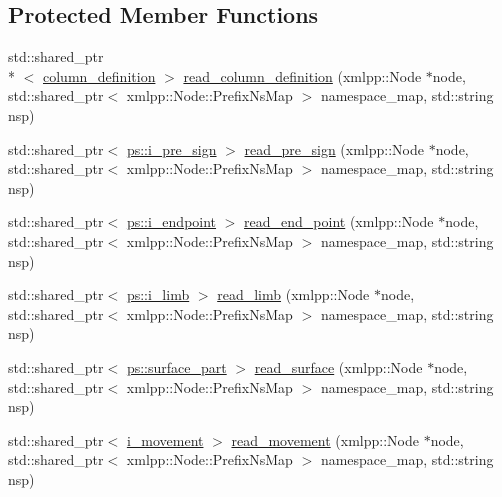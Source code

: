 \subsection*{Protected Member Functions}
\begin{DoxyCompactItemize}
\item 
std\-::shared\-\_\-ptr\\*
$<$ \hyperlink{classmae_1_1fl_1_1laban_1_1column__definition}{column\-\_\-definition} $>$ \hyperlink{classmae_1_1fl_1_1laban_1_1internal__laban__sequence__reader_a35b96563ec41f91be478d25db2e71d3a}{read\-\_\-column\-\_\-definition} (xmlpp\-::\-Node $\ast$node, std\-::shared\-\_\-ptr$<$ xmlpp\-::\-Node\-::\-Prefix\-Ns\-Map $>$ namespace\-\_\-map, std\-::string nsp)
\item 
std\-::shared\-\_\-ptr$<$ \hyperlink{classmae_1_1fl_1_1laban_1_1ps_1_1i__pre__sign}{ps\-::i\-\_\-pre\-\_\-sign} $>$ \hyperlink{classmae_1_1fl_1_1laban_1_1internal__laban__sequence__reader_a2a5210cafc9e3885600d7925fe2f4f72}{read\-\_\-pre\-\_\-sign} (xmlpp\-::\-Node $\ast$node, std\-::shared\-\_\-ptr$<$ xmlpp\-::\-Node\-::\-Prefix\-Ns\-Map $>$ namespace\-\_\-map, std\-::string nsp)
\item 
std\-::shared\-\_\-ptr$<$ \hyperlink{classmae_1_1fl_1_1laban_1_1ps_1_1i__endpoint}{ps\-::i\-\_\-endpoint} $>$ \hyperlink{classmae_1_1fl_1_1laban_1_1internal__laban__sequence__reader_ab0a5f3e61a53e389cffb39acf806fd64}{read\-\_\-end\-\_\-point} (xmlpp\-::\-Node $\ast$node, std\-::shared\-\_\-ptr$<$ xmlpp\-::\-Node\-::\-Prefix\-Ns\-Map $>$ namespace\-\_\-map, std\-::string nsp)
\item 
std\-::shared\-\_\-ptr$<$ \hyperlink{classmae_1_1fl_1_1laban_1_1ps_1_1i__limb}{ps\-::i\-\_\-limb} $>$ \hyperlink{classmae_1_1fl_1_1laban_1_1internal__laban__sequence__reader_add1037c4401c54aaf96580254ef76351}{read\-\_\-limb} (xmlpp\-::\-Node $\ast$node, std\-::shared\-\_\-ptr$<$ xmlpp\-::\-Node\-::\-Prefix\-Ns\-Map $>$ namespace\-\_\-map, std\-::string nsp)
\item 
std\-::shared\-\_\-ptr$<$ \hyperlink{classmae_1_1fl_1_1laban_1_1ps_1_1surface__part}{ps\-::surface\-\_\-part} $>$ \hyperlink{classmae_1_1fl_1_1laban_1_1internal__laban__sequence__reader_a0f4c874f59ac1e2094b8d96fafe30012}{read\-\_\-surface} (xmlpp\-::\-Node $\ast$node, std\-::shared\-\_\-ptr$<$ xmlpp\-::\-Node\-::\-Prefix\-Ns\-Map $>$ namespace\-\_\-map, std\-::string nsp)
\item 
std\-::shared\-\_\-ptr$<$ \hyperlink{classmae_1_1fl_1_1laban_1_1i__movement}{i\-\_\-movement} $>$ \hyperlink{classmae_1_1fl_1_1laban_1_1internal__laban__sequence__reader_ad869095bb733239c6ffc2103fbbf4b34}{read\-\_\-movement} (xmlpp\-::\-Node $\ast$node, std\-::shared\-\_\-ptr$<$ xmlpp\-::\-Node\-::\-Prefix\-Ns\-Map $>$ namespace\-\_\-map, std\-::string nsp)

\end{DoxyCompactItemize}
